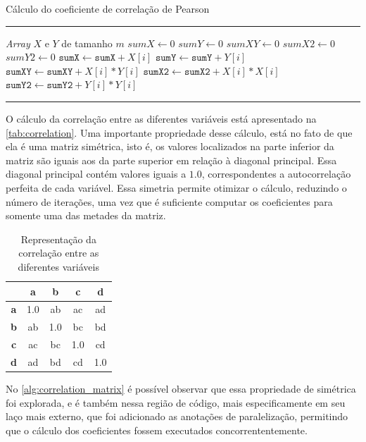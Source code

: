 \begin{algorithm}[htb]
	\caption{Cálculo do coeficiente de correlação de Pearson}
	\label{alg:correlation}
	\hrule
	\begin{algorithmic}[1]
		\REQUIRE \textit{Array} $X$ e $Y$ de tamanho $m$
		\STATE $sumX \gets 0$
		\STATE $sumY \gets 0$
		\STATE $sumXY \gets 0$
		\STATE $sumX2 \gets 0$
		\STATE $sumY2 \gets 0$
		\STATE $\texttt{sumX} \gets \texttt{sumX} + X[i]$
		\STATE $\texttt{sumY} \gets \texttt{sumY} + Y[i]$
		\STATE $\texttt{sumXY} \gets \texttt{sumXY} + X[i] * Y[i]$
		\STATE $\texttt{sumX2} \gets \texttt{sumX2} + X[i] * X[i]$
		\STATE $\texttt{sumY2} \gets \texttt{sumY2} + Y[i] * Y[i]$
		\ENDFOR
	\end{algorithmic}
	\hrule
	\fonte{}
\end{algorithm}

O cálculo da correlação entre as diferentes variáveis está apresentado na \autoref{tab:correlation}. Uma importante propriedade desse cálculo, está no fato de que ela é uma matriz simétrica, isto é, os valores localizados na parte inferior da matriz são iguais aos da parte superior em relação à diagonal principal. Essa diagonal principal contém valores iguais a $1.0$, correspondentes a autocorrelação perfeita de cada variável. Essa simetria permite otimizar o cálculo, reduzindo o número de iterações, uma vez que é suficiente computar os coeficientes para somente uma das metades da matriz.

\begin{table}[htb]
	\centering
	\begin{tabular}{|c|c|c|c|c|}
		\hline
		           & \textbf{a} & \textbf{b} & \textbf{c} & \textbf{d} \\
		\hline
		\textbf{a} & 1.0        & ab         & ac         & ad         \\
		\hline
		\textbf{b} & ab         & 1.0        & bc         & bd         \\
		\hline
		\textbf{c} & ac         & bc         & 1.0        & cd         \\
		\hline
		\textbf{d} & ad         & bd         & cd         & 1.0        \\
		\hline
	\end{tabular}
	\caption{Representação da correlação entre as diferentes variáveis}
	\fonte{}
	\label{tab:correlation}
\end{table}

No \autoref{alg:correlation_matrix} é possível observar que essa propriedade de simétrica foi explorada, e é também nessa região de código, mais especificamente em seu laço mais externo, que foi adicionado as anotações de paralelização, permitindo que o cálculo dos coeficientes fossem executados concorrententemente.

